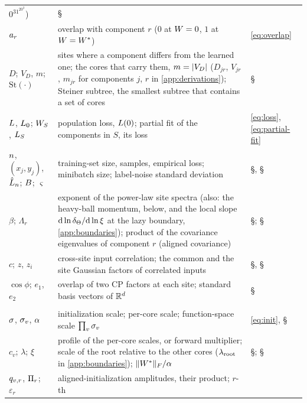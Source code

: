\begin{xltabular}{\textwidth}{@{}>{\raggedright\arraybackslash}p{3.1cm}X
    >{\raggedright\arraybackslash}p{2.5cm}@{}}
    $0^31^20^3$) & \S{} \\
  $a_{r}$ & overlap with component $r$ ($0$ at $W=0$, $1$ at $W=W^{*}$) & \eqref{eq:overlap} \\
  $D$; $V_D$, $m$; $\mathrm{St}(\cdot)$ & sites where a component differs from the learned one; the cores
    that carry them, $m=\lvert V_D\rvert$ ($D_{jr}$, $V_{jr}$, $m_{jr}$ for components $j$, $r$ in
    \cref{app:derivations}); Steiner subtree, the smallest subtree that contains a set of cores
    & \S{} \\
  $L$, $L_0$; $W_S$, $L_S$ & population loss, $L(0)$; partial fit
    of the components in $S$, its loss & \eqref{eq:loss}, \eqref{eq:partial-fit} \\
  $n$, $(x_j,y_j)$, $\hat{L}_{n}$; $B$; $\varsigma$ & training-set size, samples, empirical loss; minibatch
    size; label-noise standard deviation & \S{}, \S{} \\
  $\beta$; $\Lambda_r$ & exponent of the power-law site spectra (also: the heavy-ball momentum, below, and
    the local slope $\mathrm{d}\ln\delta_{\Theta}/\mathrm{d}\ln\xi$ at the lazy boundary, \cref{app:boundaries}); product of the
    covariance eigenvalues of component $r$ (aligned covariance)
    & \S{}; \S{} \\
  $c$; $z$, $z_i$ & cross-site input correlation; the common and the site Gaussian factors of correlated
    inputs & \S{}, \S{} \\
  $\cos\phi$; $e_1$, $e_2$ & overlap of two CP factors at each site; standard basis vectors of
    $\mathbb{R}^d$ & \S{} \\
  \midrule
   \\
  $\sigma$, $\sigma_{v}$, $\alpha$ & initialization scale; per-core scale; function-space scale $\prod_v\sigma_{v}$
    & \eqref{eq:init}, \S{} \\
  $c_v$; $\lambda$; $\xi$ & profile of the per-core scales, or forward multiplier; scale of the root
    relative to the other cores ($\lambda_{\rm root}$ in \cref{app:boundaries}); $\lVert W^{*}\rVert_{F}/\alpha$
    & \S{}; \S{} \\
  $q_{v,r}$, $\Pi_{r}$; $\varepsilon_r$ & aligned-initialization amplitudes, their product; $r$-th

\end{xltabular}

